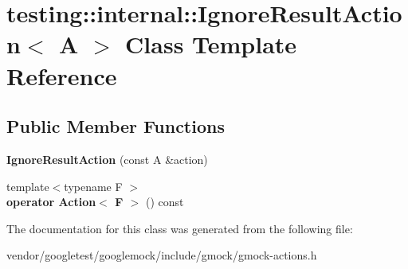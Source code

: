 \hypertarget{classtesting_1_1internal_1_1_ignore_result_action}{}\section{testing\+:\+:internal\+:\+:Ignore\+Result\+Action$<$ A $>$ Class Template Reference}
\label{classtesting_1_1internal_1_1_ignore_result_action}
\subsection*{Public Member Functions}
\begin{DoxyCompactItemize}
\item 
\mbox{\label{classtesting_1_1internal_1_1_ignore_result_action_a9199f7b1b7771b2e2a5fd28caf624623}} 
{\bfseries Ignore\+Result\+Action} (const A \&action)
\item 
\mbox{\label{classtesting_1_1internal_1_1_ignore_result_action_affb8b7439604c860e1416f45339c6e37}} 
{\footnotesize template$<$typename F $>$ }\\{\bfseries operator Action$<$ F $>$} () const
\end{DoxyCompactItemize}


The documentation for this class was generated from the following file\+:\begin{DoxyCompactItemize}
\item 
vendor/googletest/googlemock/include/gmock/gmock-\/actions.\+h\end{DoxyCompactItemize}
